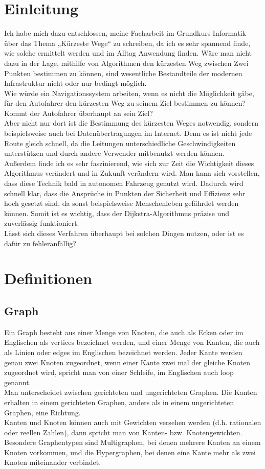 \documentclass[12pt]{article}
\begin{document}
\section{Einleitung}
	Ich habe mich dazu entschlossen, meine Facharbeit im Grundkurs Informatik über das Thema „Kürzeste Wege“ zu schreiben, da ich es sehr spannend finde, wie solche ermittelt werden und im Alltag Anwendung finden. Wäre man nicht dazu in der Lage, mithilfe von Algorithmen den kürzesten Weg zwischen Zwei Punkten bestimmen zu können, sind wesentliche Bestandteile der modernen Infrastruktur nicht oder nur bedingt möglich.\\
	Wie würde ein Navigationssystem arbeiten, wenn es nicht die Möglichkeit gäbe, für den Autofahrer den kürzesten Weg zu seinem Ziel bestimmen zu können? Kommt der Autofahrer überhaupt an sein Ziel?\\
	Aber nicht nur dort ist die Bestimmung des kürzesten Weges notwendig, sondern beispielsweise auch bei Datenübertragungen im Internet. Denn es ist nicht jede Route gleich schnell, da die Leitungen unterschiedliche Geschwindigkeiten unterstützen und durch andere Verwender mitbenutzt werden können.\\
	Außerdem finde ich es sehr faszinierend, wie sich zur Zeit die Wichtigkeit dieses Algorithmus verändert und in Zukunft verändern wird. Man kann sich vorstellen, dass diese Technik bald in autonomen Fahrzeug genutzt wird. Dadurch wird schnell klar, dass die Ansprüche in Punkten der Sicherheit und Effizienz sehr hoch gesetzt sind, da sonst beispielsweise Menschenleben gefährdet werden können. Somit ist es wichtig, dass der Dijkstra-Algorithmus präzise und zuverlässig funktioniert.\\
	Lässt sich dieses Verfahren überhaupt bei solchen Dingen nutzen, oder ist es dafür zu fehleranfällig?
	

\section{Definitionen}
	\subsection{Graph}
		Ein Graph besteht aus einer Menge von Knoten, die auch als Ecken oder im Englischen als vertices bezeichnet werden, und einer Menge von Kanten, die auch als Linien oder edges im Englischen bezeichnet werden. Jeder Kante werden genau zwei Knoten zugeordnet, wenn einer Kante zwei mal der gleiche Knoten zugeordnet wird, spricht man von einer Schleife, im Englischen auch loop genannt.\\
		Man unterscheidet zwischen gerichteten und ungerichteten Graphen. Die Kanten erhalten in einem gerichteten Graphen, anders als in einem ungerichteten Graphen, eine Richtung. \cite{graphentheorie}\\
		Kanten und Knoten können auch mit Gewichten versehen werden (d.h. rationalen oder reellen Zahlen), dann spricht man von Kanten- bzw. Knotengewichten.\\
		Besondere Graphentypen sind Multigraphen, bei denen mehrere Kanten an einem Knoten vorkommen, und die Hypergraphen, bei denen eine Kante mehr als zwei Knoten miteinander verbindet. \cite{graphentheorie2}
			
\end{document}
